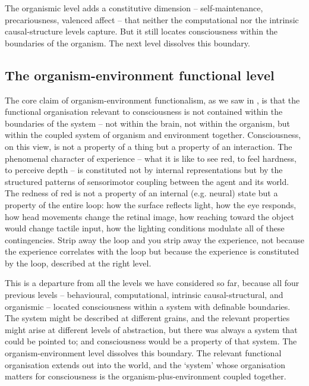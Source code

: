 \documentclass[11pt, a4paper, onecolumn, gdm]{google}
\begin{document}
The organismic level adds a constitutive dimension -- self-maintenance, precariousness, valenced affect -- that neither the computational nor the intrinsic causal-structure levels capture.
But it still locates consciousness within the boundaries of the organism.
The next level dissolves this boundary.

\subsection{The organism-environment functional level}\label{the-organism-environment-functional-level}

The core claim of organism-environment functionalism, as we saw in , is that the functional organisation relevant to consciousness is not contained within the boundaries of the system -- not within the brain, not within the organism, but within the coupled system of organism and environment together.
Consciousness, on this view, is not a property of a thing but a property of an interaction.
The phenomenal character of experience -- what it is like to see red, to feel hardness, to perceive depth -- is constituted not by internal representations but by the structured patterns of sensorimotor coupling between the agent and its world.
The redness of red is not a property of an internal (e.g. neural) state but a property of the entire loop: how the surface reflects light, how the eye responds, how head movements change the retinal image, how reaching toward the object would change tactile input, how the lighting conditions modulate all of these contingencies.
Strip away the loop and you strip away the experience, not because the experience correlates with the loop but because the experience is constituted by the loop, described at the right level.

This is a departure from all the levels we have considered so far, because all four previous levels -- behavioural, computational, intrinsic causal-structural, and organismic -- located consciousness within a system with definable boundaries.
The system might be described at different grains, and the relevant properties might arise at different levels of abstraction, but there was always a system that could be pointed to; and consciousness would be a property of that system.
The organism-environment level dissolves this boundary.
The relevant functional organisation extends out into the world, and the `system' whose organisation matters for consciousness is the organism-plus-environment coupled together.
\end{document}
